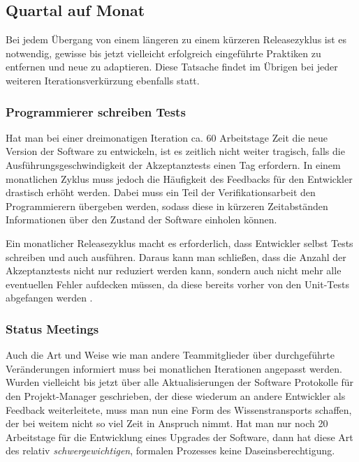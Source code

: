 \subsection{Quartal auf Monat}
\label{subsec:quartal-auf-monat}

Bei jedem Übergang von einem längeren zu einem kürzeren Releasezyklus ist es
notwendig, gewisse bis jetzt vielleicht erfolgreich eingeführte Praktiken zu
entfernen und neue zu adaptieren. Diese Tatsache findet im Übrigen bei jeder 
weiteren Iterationsverkürzung ebenfalls statt.

\subsubsection{Programmierer schreiben Tests}
\label{minisec:programmierer-schreiben-tests}
Hat man bei einer dreimonatigen Iteration ca. 60 Arbeitstage Zeit die neue
Version der Software zu entwickeln, ist es zeitlich nicht weiter tragisch,
falls die Ausführungsgeschwindigkeit der Akzeptanztests einen Tag erfordern.
In einem monatlichen Zyklus muss jedoch die Häufigkeit des Feedbacks für den
Entwickler drastisch erhöht werden. Dabei muss ein Teil der
Verifikationsarbeit den Programmierern übergeben werden, sodass diese in
kürzeren Zeitabständen Informationen über den Zustand der Software einholen
können.

Ein monatlicher Releasezyklus macht es erforderlich, dass Entwickler selbst
Tests schreiben und auch ausführen. Daraus kann man schließen, dass die Anzahl
der Akzeptanztests nicht nur reduziert werden kann, sondern auch nicht mehr
alle eventuellen Fehler aufdecken müssen, da diese bereits vorher von den
Unit-Tests abgefangen werden \cite{pragunittesting2003}.

\subsubsection{Status Meetings}
\label{minisec:status-meetings}

Auch die Art und Weise wie man andere Teammitglieder über durchgeführte
Veränderungen informiert muss bei monatlichen Iterationen angepasst werden.
Wurden vielleicht bis jetzt über alle Aktualisierungen der Software Protokolle
für den Projekt-Manager geschrieben, der diese wiederum an andere Entwickler
als Feedback weiterleitete, muss man nun eine Form des Wissenstransports
schaffen, der bei weitem nicht so viel Zeit in Anspruch nimmt. Hat man nur
noch 20 Arbeitstage für die Entwicklung eines Upgrades der Software, dann hat
diese Art des relativ \emph{schwergewichtigen}, formalen Prozesses keine
Daseinsberechtigung.


